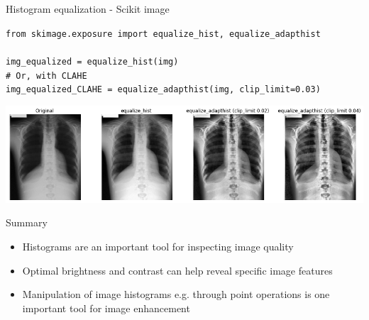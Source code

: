 \documentclass[9pt, aspectratio=169]{beamer}
\begin{document}
\begin{frame}
    {Histogram equalization - Scikit image}
    \begin{codebox}
        \texttt{from skimage.exposure import equalize\_hist, equalize\_adapthist\\
            \\
            img\_equalized = equalize\_hist(img)\\
            \# Or, with CLAHE\\
            img\_equalized\_CLAHE = equalize\_adapthist(img, clip\_limit=0.03)
        }
    \end{codebox}
    \centering
    \includegraphics[width=\textwidth]{various_equalizations.png}
\end{frame}

\begin{frame}
{Summary}
\begin{itemize}
\item Histograms are an important tool for inspecting image quality
\item Optimal brightness and contrast can help reveal specific image features
\item Manipulation of image histograms e.g. through point operations is one important tool for image enhancement
\end{itemize}
\end{frame}
\end{document}

